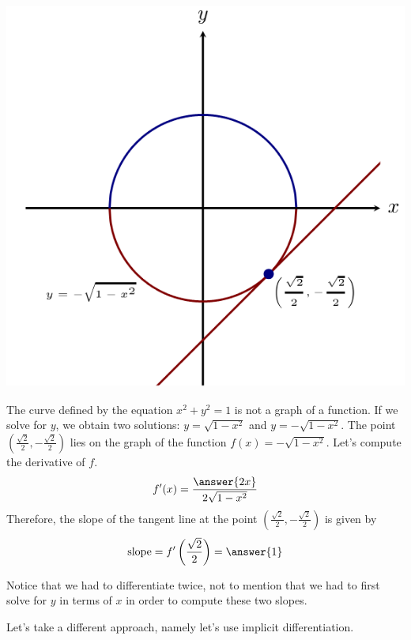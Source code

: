\documentclass{ximera}
\begin{document}
\begin{example}
\begin{enumerate}
\begin{explanation}
\begin{image}
      \includegraphics{1.png}
\end{image}
The curve defined by the equation  $x^2 + y^2 = 1$ is not a graph of a function. If we solve for $y$, we obtain two solutions:
$y=\sqrt{1-x^2}$ and $y=-\sqrt{1-x^2}$. 
The point $\left(\frac{\sqrt{2}}{2},-\frac{\sqrt{2}}{2}\right)$ lies on the graph of the function $f(x)=-\sqrt{1-x^2}$.
Let's compute the derivative of $f$.
\[
f'(x)=\frac{\answer{2x}}{2\sqrt{1-x^2}}
\]
Therefore, the slope of the tangent line at the point $\left(\frac{\sqrt{2}}{2},-\frac{\sqrt{2}}{2}\right)$ is given by
\[
\text{slope}=f'\left(\frac{\sqrt{2}}{2}\right)=\answer{1}
\]

Notice that we had to differentiate twice, not to mention that we had to first solve for $y$ in terms of $x$ in order to compute these two slopes.
\end{explanation}
\end{enumerate}
\end{example}
Let's take a different approach, namely let's use implicit differentiation.
\end{document}
